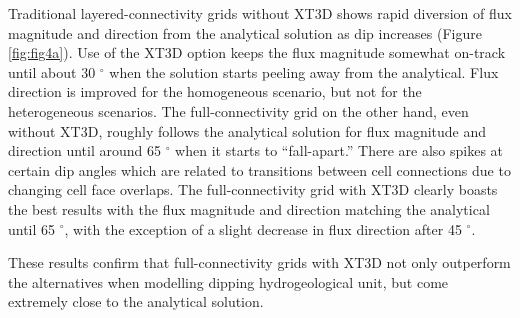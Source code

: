 \documentclass{article}
\begin{document}
Traditional layered-connectivity grids without XT3D shows rapid diversion of flux magnitude and direction from the analytical solution as dip increases (Figure \ref{fig:fig4a}). Use of the XT3D option keeps the flux magnitude somewhat on-track until about 30 $^{\circ}$ when the solution starts peeling away from the analytical. Flux direction is improved for the homogeneous scenario, but not for the heterogeneous scenarios. The full-connectivity grid on the other hand, even without XT3D, roughly follows the analytical solution for flux magnitude and direction until around 65 $^{\circ}$ when it starts to ``fall-apart.'' There are also spikes at certain dip angles which are related to transitions between cell connections due to changing cell face overlaps. The full-connectivity grid with XT3D clearly boasts the best results with the flux magnitude and direction matching the analytical until 65 $^{\circ}$, with the exception of a slight decrease in flux direction after 45 $^{\circ}$.

These results confirm that full-connectivity grids with XT3D not only outperform the alternatives when modelling dipping hydrogeological unit, but come extremely close to the analytical solution.
\end{document}
